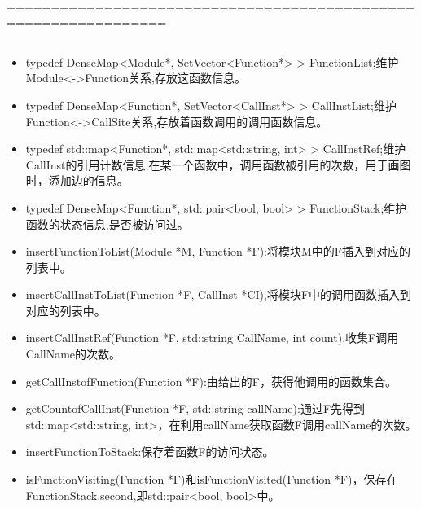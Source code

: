 \section{}



================================================================



\subsection{}
\begin{itemize}

\item{typedef DenseMap<Module*, SetVector<Function*> > FunctionList;维护Module<->Function关系,存放这函数信息。}

\item{typedef DenseMap<Function*, SetVector<CallInst*> > CallInstList;维护Function<->CallSite关系,存放着函数调用的调用函数信息。}

\item{typedef std::map<Function*, std::map<std::string, int> > CallInstRef;维护CallInst的引用计数信息,在某一个函数中，调用函数被引用的次数，用于画图时，添加边的信息。}

\item{typedef DenseMap<Function*, std::pair<bool, bool> > FunctionStack;维护函数的状态信息,是否被访问过。} 

\end{itemize}

\begin{itemize}

\item{insertFunctionToList(Module *M, Function *F):将模块M中的F插入到对应的列表中。}
\item{insertCallInstToList(Function *F, CallInst *CI),将模块F中的调用函数插入到对应的列表中。}
\item{insertCallInstRef(Function *F, std::string CallName, int count),收集F调用CallName的次数。}
\item{getCallInstofFunction(Function *F):由给出的F，获得他调用的函数集合。}
\item{getCountofCallInst(Function *F, std::string callName):通过F先得到std::map<std::string, int>，在利用callName获取函数F调用callName的次数。}
\item{insertFunctionToStack:保存着函数F的访问状态。}
\item{isFunctionVisiting(Function *F)和isFunctionVisited(Function *F)，保存在FunctionStack.second,即std::pair<bool, bool>中。}
\end{itemize}


